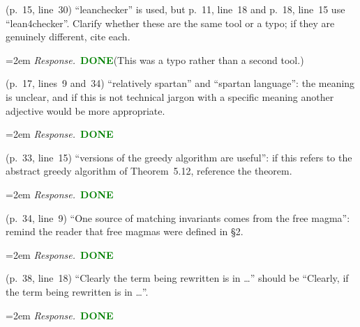 \documentclass[11pt]{amsart}
\newcommand{\done}{\textcolor{green}{\textbf{DONE}}}
\newcommand{\response}[1]{%
  \par\smallskip
  \noindent\hangindent=2em\hangafter=1
  \textit{Response.}\ #1
  \par\smallskip}
\begin{document}
\begin{requests}[label=\textbf{R2.T\arabic*}]
\item (p.~15, line~30) ``leanchecker'' is used, but p.~11, line~18 and p.~18, line~15
use ``lean4checker''. Clarify whether these are the same tool or a typo; if they are
genuinely different, cite each.
\response{\done (This was a typo rather than a second tool.)}

\item (p.~17, lines~9 and~34) ``relatively spartan'' and ``spartan language'': the
meaning is unclear, and if this is not technical jargon with a specific meaning another
adjective would be more appropriate.
\response{\done}

\item (p.~33, line~15) ``versions of the greedy algorithm are useful'': if this refers
to the abstract greedy algorithm of Theorem~5.12, reference the theorem.
\response{\done}

\item (p.~34, line~9) ``One source of matching invariants comes from the free magma'':
remind the reader that free magmas were defined in \S2.
\response{\done}

\item (p.~38, line~18) ``Clearly the term being rewritten is in \dots'' should be
``Clearly, if the term being rewritten is in \dots''.
\response{\done}

\end{requests}
\end{document}
